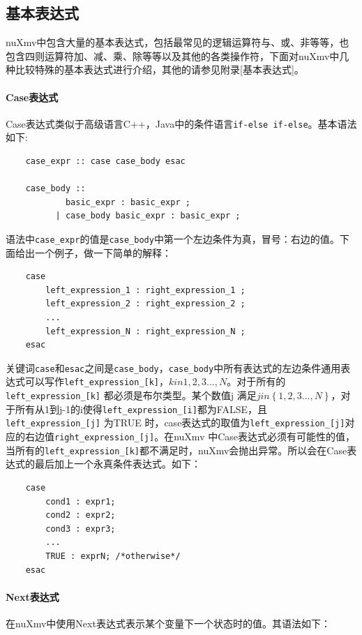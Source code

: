 \subsection{基本表达式}
nuXmv中包含大量的基本表达式，包括最常见的逻辑运算符与、或、非等等，也包含四则运算符加、减、乘、除等等以及其他的各类操作符，下面对nuXmv中几种比较特殊的基本表达式进行介绍，其他的请参见附录[基本表达式]。

\paragraph{Case表达式}
Case表达式类似于高级语言C++，Java中的条件语言\verb|if-else if-else|。基本语法如下:

\begin{lstlisting}
    case_expr :: case case_body esac

    case_body ::
            basic_expr : basic_expr ;
          | case_body basic_expr : basic_expr ;
\end{lstlisting}

语法中\verb|case_expr|的值是\verb|case_body|中第一个左边条件为真，冒号：右边的值。下面给出一个例子，做一下简单的解释：

\begin{lstlisting}
    case
        left_expression_1 : right_expression_1 ;
        left_expression_2 : right_expression_2 ;
        ...
        left_expression_N : right_expression_N ;
    esac
\end{lstlisting}

关键词\verb|case|和\verb|esac|之间是\verb|case_body|，\verb|case_body|中所有表达式的左边条件通用表达式可以写作\verb|left_expression_[k]|，$k in {1,2,3...,N}$。对于所有的\verb|left_expression_[k]| 都必须是布尔类型。某个数值j 满足$ j in \left\{1,2,3...,N \right\}$，对于所有从1到j-1的i使得\verb|left_expression_[i]|都为FALSE，且\verb|left_expression_[j]| 为TRUE 时，case表达式的取值为\verb|left_expression_[j]|对应的右边值\verb|right_expression_[j]|。在nuXmv 中Case表达式必须有可能性的值，当所有的\verb|left_expression_[k]|都不满足时，nuXmv会抛出异常。所以会在Case表达式的最后加上一个永真条件表达式。如下：

\begin{lstlisting}
    case
        cond1 : expr1;
        cond2 : expr2;
        cond3 : expr3;
        ...
        TRUE : exprN; /*otherwise*/
    esac
\end{lstlisting}

\paragraph{Next表达式}
在nuXmv中使用Next表达式表示某个变量下一个状态时的值。其语法如下：

